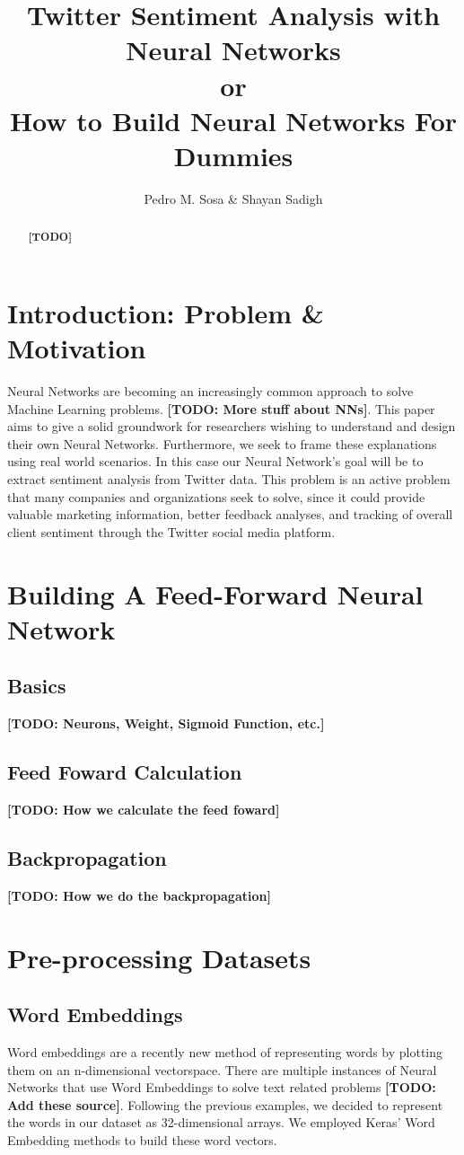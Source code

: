 \documentclass[11pt,onecolumn]{article} %
\title{Twitter Sentiment Analysis with Neural Networks\\or\\ How to Build Neural Networks For Dummies}
\author{Pedro M. Sosa \& Shayan Sadigh}
\begin{document}
\maketitle

\begin{abstract}
\textbf{[TODO]}
\end{abstract}

\section{Introduction: Problem \& Motivation}
Neural Networks are becoming an increasingly common approach to solve Machine Learning problems. \textbf{[TODO: More stuff about NNs]}. This paper aims to give a solid groundwork for researchers wishing to understand and design their own Neural Networks. Furthermore, we seek to frame these explanations using real world scenarios. In this case our Neural Network's goal will be to extract sentiment analysis from Twitter data. This problem is an active problem that many companies and organizations seek to solve, since it could provide valuable marketing information, better feedback analyses, and tracking of overall client sentiment through the Twitter social media platform.


\section{Building A Feed-Forward Neural Network}
\subsection{Basics}
\textbf{[TODO: Neurons, Weight, Sigmoid Function, etc.]}
\subsection{Feed Foward Calculation}
\textbf{[TODO: How we calculate the feed foward]}
\subsection{Backpropagation}
\textbf{[TODO: How we do the backpropagation]}

\section{Pre-processing Datasets}
\subsection{Word Embeddings}
Word embeddings are a recently new method of representing words by plotting them on an n-dimensional vectorspace. There are multiple instances of Neural Networks that use Word Embeddings to solve text related problems \textbf{[TODO: Add these source]}. Following the previous examples, we decided to represent the words in our dataset as 32-dimensional arrays. We employed Keras' Word Embedding methods to build these word vectors.
\end{document}

